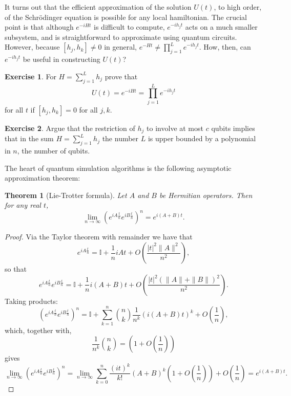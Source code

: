 \documentclass[12pt,oneside]{amsart}
\theoremstyle{plain}%
\newtheorem{theorem}{Theorem}[section]
\theoremstyle{definition}
\newtheorem{exercise}{\color{cgblue}Exercise}[section]
\theoremstyle{remark}
\begin{document}
It turns out that the efficient approximation of the solution $U(t)$, to high order, of the Schrödinger equation is possible for any local hamiltonian. The crucial point is that although $e^{-iHt}$ is difficult to compute, $e^{-ih_jt}$ acts on a much smaller subsystem, and is straightforward to approximate using quantum circuits. However, because $[h_j,h_k]\not= 0$ in general, $e^{-Ht} \not= \prod_{j=1}^L e^{-ih_jt}$. How, then, can $e^{-ih_jt}$ be useful in constructing $U(t)$?

\begin{exercise}
For $H = \sum_{j=1}^L h_j$ prove that 
\begin{equation}
  U(t) = e^{-iHt} = \prod_{j=1}^L e^{-ih_jt}
\end{equation}
for all $t$ if $[h_j,h_k]= 0$ for all $j,k$.
\end{exercise}

\begin{exercise}
Argue that the restriction of $h_j$ to involve at most $c$ qubits implies that in the sum $H = \sum_{j=1}^L h_j$ the number $L$ is upper bounded by a polynomial in $n$, the number of qubits.
\end{exercise}

The heart of quantum simulation algorithms is the following asymptotic approximation theorem:
\begin{theorem}[Lie-Trotter formula]
  Let $A$ and $B$ be Hermitian operators. Then for any real $t$,
  \begin{equation}
    \lim_{n\rightarrow \infty} \left(e^{iA\frac{t}{n}}e^{iB\frac{t}{n}}\right)^{n} = e^{i(A+B)t}.
  \end{equation}
\end{theorem}
\begin{proof}
  Via the Taylor theorem with remainder we have that
  \begin{equation}
    e^{iA\frac{t}{n}} = \mathbb{I}+ \frac{1}{n} iAt + O\left(\frac{|t|^2\|A\|^2}{n^2}\right),
  \end{equation}
  so that
  \begin{equation}
    e^{iA\frac{t}{n}}e^{iB\frac{t}{n}} = \mathbb{I}+ \frac{1}{n} i(A+B)t + O\left(\frac{|t|^2(\|A\|+\|B\|)^2}{n^2}\right).
  \end{equation}
  Taking products:
  \begin{equation}
    \left(e^{iA\frac{t}{n}}e^{iB\frac{t}{n}}\right)^{n} = \mathbb{I}+ \sum_{k=1}^n \binom{n}{k}\frac{1}{n^k} \left(i(A+B)t\right)^k + O\left(\frac{1}{n}\right),
  \end{equation}
  which, together with, 
  \begin{equation}
    \frac{1}{n^k}\binom{n}{k} = \left(1+O\left(\frac{1}{n}\right)\right)
  \end{equation}
  gives
  \begin{equation}
    \lim_{n\rightarrow \infty} \left(e^{iA\frac{t}{n}}e^{iB\frac{t}{n}}\right)^{n} = \lim_{n\rightarrow \infty}\sum_{k=0}^n \frac{(it)^k}{k!}(A+B)^k\left(1+O\left(\frac{1}{n}\right)\right) + O\left(\frac{1}{n}\right) = e^{i(A+B)t}.
  \end{equation}
\end{proof}
\end{document}
